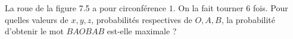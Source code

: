 La roue de la figure 7.5 a pour circonférence $1$. On la fait tourner $6$ fois. Pour quelles valeurs de $x, y, z$, probabilités respectives de $O, A, B$, la probabilité d'obtenir le mot $BAOBAB$ est-elle maximale ?

\begin{center}
\end{center}
